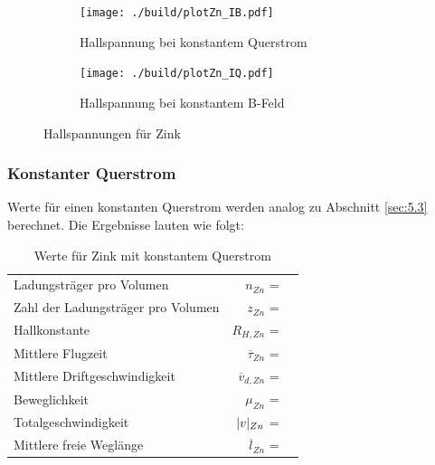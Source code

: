 \begin{figure}[H]
\begin{subfigure}{0.495\linewidth}
\centering
\texttt{[image: ./build/plotZn\_IB.pdf]}
\caption{Hallspannung bei konstantem Querstrom}
\end{subfigure}
\begin{subfigure}{0.495\linewidth}
\centering
\texttt{[image: ./build/plotZn\_IQ.pdf]}
\caption{Hallspannung bei konstantem B-Feld}
\end{subfigure}
\caption{Hallspannungen für Zink}
\end{figure}

\subsubsection{Konstanter Querstrom} \label{sec:5.5.1}

\justifying Werte für einen konstanten Querstrom werden analog zu Abschnitt \ref{sec:5.3} berechnet. Die Ergebnisse lauten wie folgt:

\begin{table}[H]
\centering
    \begin{tabular}{l r l}
    \toprule
        Ladungsträger pro Volumen               &$n_{Zn}$               = & \text{}  \\
        Zahl der Ladungsträger pro Volumen      &$z_{Zn}$               = & \text{}  \\
        Hallkonstante                           &$R_{H,Zn}$             = & \text{} \\
        Mittlere Flugzeit                       &$\overline{\tau}_{Zn}$ = & \text{}\\
        Mittlere Driftgeschwindigkeit           &$\overline{v}_{d,Zn}$  = & \text{}\\
        Beweglichkeit                           &$\mu_{Zn}$             = & \text{} \\
        Totalgeschwindigkeit                    &$\lvert v\rvert_{Zn}$         = & \text{}  \\
        Mittlere freie Weglänge                 &$\overline{l}_{Zn}$    = & \text{}  \\
        \bottomrule
    \end{tabular}
\caption{Werte für Zink mit konstantem Querstrom}
\label{tab:9}
\end{table}

